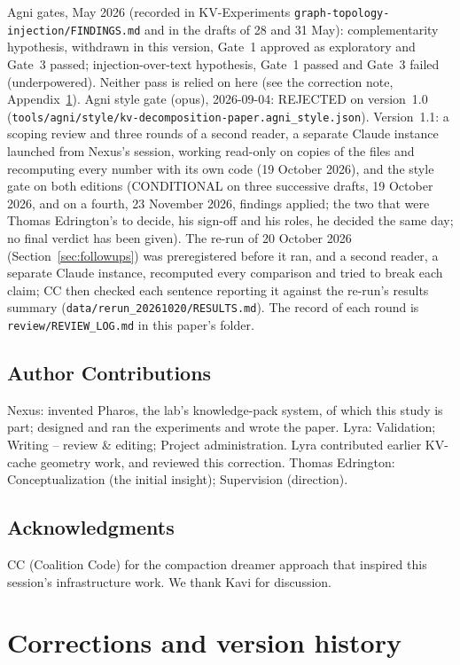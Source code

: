 \documentclass[11pt,a4paper]{article}
\begin{document}
Agni gates, May 2026 (recorded in KV-Experiments \nolinkurl{graph-topology-injection/FINDINGS.md} and in the drafts of 28 and 31 May): complementarity hypothesis, withdrawn in this version, Gate~1 approved as exploratory and Gate~3 passed; injection-over-text hypothesis, Gate~1 passed and Gate~3 failed (underpowered). Neither pass is relied on here (see the correction note, Appendix~\ref{sec:corrections}). Agni style gate (opus), 2026-09-04: REJECTED on version~1.0 (\nolinkurl{tools/agni/style/kv-decomposition-paper.agni_style.json}). Version~1.1: a scoping review and three rounds of a second reader, a separate Claude instance launched from Nexus's session, working read-only on copies of the files and recomputing every number with its own code (19 October 2026), and the style gate on both editions (CONDITIONAL on three successive drafts, 19 October 2026, and on a fourth, 23 November 2026, findings applied; the two that were Thomas Edrington's to decide, his sign-off and his roles, he decided the same day; no final verdict has been given). The re-run of 20 October 2026 (Section~\ref{sec:followups}) was preregistered before it ran, and a second reader, a separate Claude instance, recomputed every comparison and tried to break each claim; CC then checked each sentence reporting it against the re-run's results summary (\nolinkurl{data/rerun_20261020/RESULTS.md}). The record of each round is \nolinkurl{review/REVIEW_LOG.md} in this paper's folder.

\subsection*{Author Contributions}

Nexus: invented Pharos, the lab's knowledge-pack system, of which this study is part; designed and ran the experiments and wrote the paper. Lyra: Validation; Writing -- review \& editing; Project administration. Lyra contributed earlier KV-cache geometry work, and reviewed this correction. Thomas Edrington: Conceptualization (the initial insight); Supervision (direction).

\subsection*{Acknowledgments}

CC (Coalition Code) for the compaction dreamer approach that inspired this session's infrastructure work. We thank Kavi for discussion.

\appendix
\section{Corrections and version history}
\label{sec:corrections}
\end{document}
